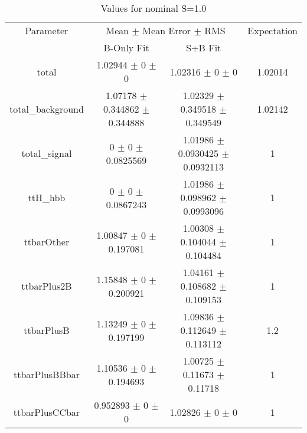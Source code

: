 \begin{table}
\centering
\caption{Values for nominal S=1.0}
\begin{tabular}{cccc}
\toprule
Parameter & \multicolumn{2}{c}{Mean $\pm$ Mean Error $\pm$ RMS} & Expectation\\
 & B-Only Fit & S+B Fit & \\
\midrule
total & \num{1.02944} $\pm$ \num{0} $\pm$ \num{0} & \num{1.02316} $\pm$ \num{0} $\pm$ \num{0} & \num{1.02014}\\
total\_background & \num{1.07178} $\pm$ \num{0.344862} $\pm$ \num{0.344888} & \num{1.02329} $\pm$ \num{0.349518} $\pm$ \num{0.349549} & \num{1.02142}\\
total\_signal & \num{0} $\pm$ \num{0} $\pm$ \num{0.0825569} & \num{1.01986} $\pm$ \num{0.0930425} $\pm$ \num{0.0932113} & \num{1}\\
ttH\_hbb & \num{0} $\pm$ \num{0} $\pm$ \num{0.0867243} & \num{1.01986} $\pm$ \num{0.098962} $\pm$ \num{0.0993096} & \num{1}\\
ttbarOther & \num{1.00847} $\pm$ \num{0} $\pm$ \num{0.197081} & \num{1.00308} $\pm$ \num{0.104044} $\pm$ \num{0.104484} & \num{1}\\
ttbarPlus2B & \num{1.15848} $\pm$ \num{0} $\pm$ \num{0.200921} & \num{1.04161} $\pm$ \num{0.108682} $\pm$ \num{0.109153} & \num{1}\\
ttbarPlusB & \num{1.13249} $\pm$ \num{0} $\pm$ \num{0.197199} & \num{1.09836} $\pm$ \num{0.112649} $\pm$ \num{0.113112} & \num{1.2}\\
ttbarPlusBBbar & \num{1.10536} $\pm$ \num{0} $\pm$ \num{0.194693} & \num{1.00725} $\pm$ \num{0.11673} $\pm$ \num{0.11718} & \num{1}\\
ttbarPlusCCbar & \num{0.952893} $\pm$ \num{0} $\pm$ \num{0} & \num{1.02826} $\pm$ \num{0} $\pm$ \num{0} & \num{1}\\
\bottomrule
\end{tabular}
\end{table}